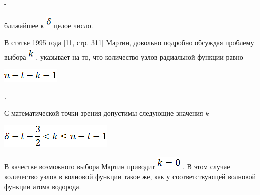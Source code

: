 \documentclass{article}
\begin{document}
 - 

\vspace{10pt}
{\large{}ближайшее к }
\includegraphics[width=8pt, height=19pt, keepaspectratio=true]{3-fig041.png}
{\large{} целое число.}

\vspace{10pt}
{\large{}В статье 1995 года [11, стр. 311] Мартин, довольно 
подробно обсуждая проблему выбора }
\includegraphics[width=8pt, height=19pt, keepaspectratio=true]{3-fig042.png}
{\large{}, указывает на то, что количество узлов 
радиальной функции равно }

\vspace{10pt}
\includegraphics[width=79pt, height=19pt, keepaspectratio=true]{3-fig043.png}

\vspace{10pt}
{\large{}.}

\vspace{10pt}
{\large{}С математической точки зрения допустимы 
следующие значения }{\large{}\textit{k}}

\vspace{10pt}
\includegraphics[width=153pt, height=34pt, keepaspectratio=true]{3-fig044.png}

\vspace{28pt}
{\large{}В качестве возможного выбора Мартин приводит 
}
\includegraphics[width=34pt, height=19pt, keepaspectratio=true]{3-fig045.png}
{\large{}. В этом случае количество узлов в волновой 
функции такое же, как у соответствующей волновой 
функции атома водорода.}
\end{document}
